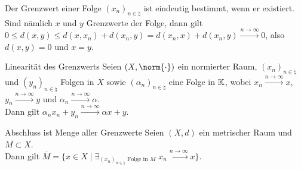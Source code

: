 \begin{Bem}
    Der Grenzwert einer Folge $(x_n)_{n \in \natural}$ ist eindeutig bestimmt, wenn er existiert.
    Sind nämlich $x$ und $y$ Grenzwerte der Folge, dann gilt\\
    $0 \le d(x, y) \le d(x, x_n) + d(x_n, y) = d(x_n, x) + d(x_n, y) \xrightarrow{n \to \infty} 0$,
    also $d(x, y) = 0$ und $x = y$.
\end{Bem}

\begin{Satz}{Linearität des Grenzwerts}
    Seien $(X, \norm{\cdot})$ ein normierter Raum,
    $(x_n)_{n \in \natural}$ und $(y_n)_{n \in \natural}$ Folgen in $X$
    sowie $(\alpha_n)_{n \in \natural}$ eine Folge in $\mathbb{K}$,
    wobei $x_n \xrightarrow{n \to \infty} x$, $y_n \xrightarrow{n \to \infty} y$ und
    $\alpha_n \xrightarrow{n \to \infty} \alpha$.\\
    Dann gilt $\alpha_n x_n + y_n \xrightarrow{n \to \infty} \alpha x + y$.
\end{Satz}

\begin{Satz}{Abschluss ist Menge aller Grenzwerte}
    Seien $(X, d)$ ein metrischer Raum und $M \subset X$.\\
    Dann gilt $\overline{M} = \{x \in X \;|\;
    \exists_{(x_n)_{n \in \natural} \text{ Folge in } M}\; x_n \xrightarrow{n \to \infty} x\}$.
\end{Satz}

\linie
\pagebreak

